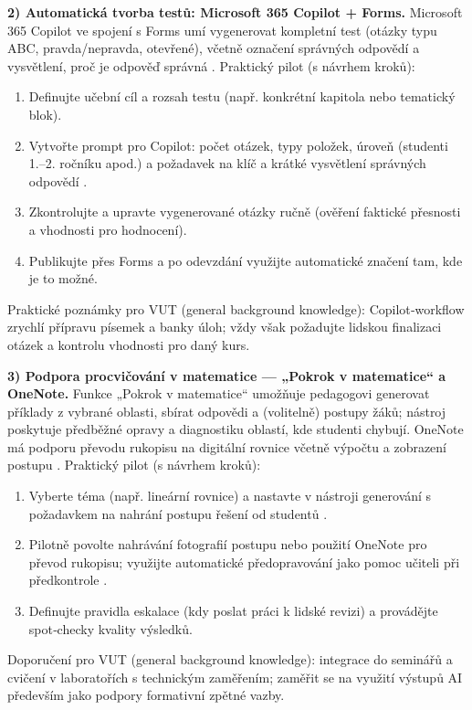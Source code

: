 \documentclass{report}%
\begin{document}
\textbf{2) Automatická tvorba testů: Microsoft 365 Copilot + Forms.}  
Microsoft 365 Copilot ve spojení s Forms umí vygenerovat kompletní test (otázky typu ABC, pravda/nepravda, otevřené), včetně označení správných odpovědí a vysvětlení, proč je odpověď správná \cite{kb_ai_101_tipu_pdf_04e4a115_page_36_1}.  
Praktický pilot (s návrhem kroků):
\begin{enumerate}
  \item Definujte učební cíl a rozsah testu (např. konkrétní kapitola nebo tematický blok).
  \item Vytvořte prompt pro Copilot: počet otázek, typy položek, úroveň (studenti 1.–2. ročníku apod.) a požadavek na klíč a krátké vysvětlení správných odpovědí \cite{kb_ai_101_tipu_pdf_04e4a115_page_36_1}.
  \item Zkontrolujte a upravte vygenerované otázky ručně (ověření faktické přesnosti a vhodnosti pro hodnocení).
  \item Publikujte přes Forms a po odevzdání využijte automatické značení tam, kde je to možné.
\end{enumerate}
Praktické poznámky pro VUT (general background knowledge): Copilot‑workflow zrychlí přípravu písemek a banky úloh; vždy však požadujte lidskou finalizaci otázek a kontrolu vhodnosti pro daný kurs.

\medskip

\textbf{3) Podpora procvičování v matematice — „Pokrok v matematice“ a OneNote.}  
Funkce „Pokrok v matematice“ umožňuje pedagogovi generovat příklady z vybrané oblasti, sbírat odpovědi a (volitelně) postupy žáků; nástroj poskytuje předběžné opravy a diagnostiku oblastí, kde studenti chybují. OneNote má podporu převodu rukopisu na digitální rovnice včetně výpočtu a zobrazení postupu \cite{kb_ai_101_tipu_pdf_04e4a115_page_8_1}.  
Praktický pilot (s návrhem kroků):
\begin{enumerate}
  \item Vyberte téma (např. lineární rovnice) a nastavte v nástroji generování s požadavkem na nahrání postupu řešení od studentů \cite{kb_ai_101_tipu_pdf_04e4a115_page_8_1}.
  \item Pilotně povolte nahrávání fotografií postupu nebo použití OneNote pro převod rukopisu; využijte automatické předopravování jako pomoc učiteli při předkontrole \cite{kb_ai_101_tipu_pdf_04e4a115_page_8_1}.
  \item Definujte pravidla eskalace (kdy poslat práci k lidské revizi) a provádějte spot‑checky kvality výsledků.
\end{enumerate}
Doporučení pro VUT (general background knowledge): integrace do seminářů a cvičení v laboratořích s technickým zaměřením; zaměřit se na využití výstupů AI především jako podpory formativní zpětné vazby.
\end{document}
